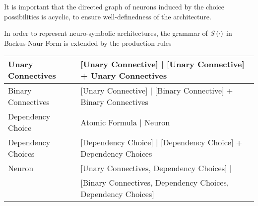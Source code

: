 It is important that the directed graph of neurons induced by the choice possibilities is acyclic, to ensure well-definedness of the architecture.


In order to represent neuro-symbolic architectures, the grammar of $S\left(\cdot\right)$ in Backus-Naur Form is extended by the production rules \\
\begin{tabular}{|l|l|}
    \hline
    Unary Connectives & [Unary Connective] | [Unary Connective] + Unary Connectives    \\
    \hline
    Binary Connectives  & [Unary Connective] | [Binary Connective] + Binary Connectives  \\
    \hline
    Dependency Choice   & Atomic Formula | Neuron                                        \\
    \hline
    Dependency Choices  & [Dependency Choice] | [Dependency Choice] + Dependency Choices \\
    \hline
    Neuron              & [Unary Connectives, Dependency Choices] |                      \\
    & [Binary Connectives, Dependency Choices, Dependency Choices]   \\
    \hline
\end{tabular}


